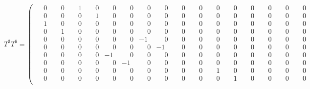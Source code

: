 \documentclass[10pt]{article}
\begin{document}
\[
T^{3}T^{6} = \left(\begin{smallmatrix}
\phantom{-}0 & \phantom{-}0 & \phantom{-}1 & \phantom{-}0 & \phantom{-}0 & \phantom{-}0 & \phantom{-}0 & \phantom{-}0 & \phantom{-}0 & \phantom{-}0 & \phantom{-}0 & \phantom{-}0 & \phantom{-}0 & \phantom{-}0 & \phantom{-}0 & \phantom{-}0 \\
\phantom{-}0 & \phantom{-}0 & \phantom{-}0 & \phantom{-}1 & \phantom{-}0 & \phantom{-}0 & \phantom{-}0 & \phantom{-}0 & \phantom{-}0 & \phantom{-}0 & \phantom{-}0 & \phantom{-}0 & \phantom{-}0 & \phantom{-}0 & \phantom{-}0 & \phantom{-}0 \\
\phantom{-}1 & \phantom{-}0 & \phantom{-}0 & \phantom{-}0 & \phantom{-}0 & \phantom{-}0 & \phantom{-}0 & \phantom{-}0 & \phantom{-}0 & \phantom{-}0 & \phantom{-}0 & \phantom{-}0 & \phantom{-}0 & \phantom{-}0 & \phantom{-}0 & \phantom{-}0 \\
\phantom{-}0 & \phantom{-}1 & \phantom{-}0 & \phantom{-}0 & \phantom{-}0 & \phantom{-}0 & \phantom{-}0 & \phantom{-}0 & \phantom{-}0 & \phantom{-}0 & \phantom{-}0 & \phantom{-}0 & \phantom{-}0 & \phantom{-}0 & \phantom{-}0 & \phantom{-}0 \\
\phantom{-}0 & \phantom{-}0 & \phantom{-}0 & \phantom{-}0 & \phantom{-}0 & \phantom{-}0 & -1 & \phantom{-}0 & \phantom{-}0 & \phantom{-}0 & \phantom{-}0 & \phantom{-}0 & \phantom{-}0 & \phantom{-}0 & \phantom{-}0 & \phantom{-}0 \\
\phantom{-}0 & \phantom{-}0 & \phantom{-}0 & \phantom{-}0 & \phantom{-}0 & \phantom{-}0 & \phantom{-}0 & -1 & \phantom{-}0 & \phantom{-}0 & \phantom{-}0 & \phantom{-}0 & \phantom{-}0 & \phantom{-}0 & \phantom{-}0 & \phantom{-}0 \\
\phantom{-}0 & \phantom{-}0 & \phantom{-}0 & \phantom{-}0 & -1 & \phantom{-}0 & \phantom{-}0 & \phantom{-}0 & \phantom{-}0 & \phantom{-}0 & \phantom{-}0 & \phantom{-}0 & \phantom{-}0 & \phantom{-}0 & \phantom{-}0 & \phantom{-}0 \\
\phantom{-}0 & \phantom{-}0 & \phantom{-}0 & \phantom{-}0 & \phantom{-}0 & -1 & \phantom{-}0 & \phantom{-}0 & \phantom{-}0 & \phantom{-}0 & \phantom{-}0 & \phantom{-}0 & \phantom{-}0 & \phantom{-}0 & \phantom{-}0 & \phantom{-}0 \\
\phantom{-}0 & \phantom{-}0 & \phantom{-}0 & \phantom{-}0 & \phantom{-}0 & \phantom{-}0 & \phantom{-}0 & \phantom{-}0 & \phantom{-}0 & \phantom{-}0 & \phantom{-}1 & \phantom{-}0 & \phantom{-}0 & \phantom{-}0 & \phantom{-}0 & \phantom{-}0 \\
\phantom{-}0 & \phantom{-}0 & \phantom{-}0 & \phantom{-}0 & \phantom{-}0 & \phantom{-}0 & \phantom{-}0 & \phantom{-}0 & \phantom{-}0 & \phantom{-}0 & \phantom{-}0 & \phantom{-}1 & \phantom{-}0 & \phantom{-}0 & \phantom{-}0 & \phantom{-}0 \\

\end{smallmatrix}\]
\end{document}
